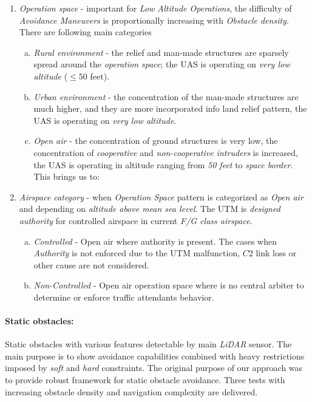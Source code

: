 \begin{enumerate}
    \item \emph{Operation space} - important for \emph{Low Altitude Operations}, the difficulty of \emph{Avoidance Maneuvers} is proportionally increasing with \emph{Obstacle density}. There are following main categories
    \begin{enumerate}[a.]
        \item \emph{Rural environment} - the relief and man-made structures are sparsely spread around the \emph{operation space};  the UAS is operating on \emph{very low altitude} ($\le 50$ feet).
        
        \item \emph{Urban environment} - the concentration of the man-made structures are much higher, and they are more incorporated info land relief pattern, the UAS is operating on \emph{very low altitude}.
        
        \item \emph{Open air} - the concentration of ground structures is very low, the concentration of \emph{cooperative} and \emph{non-cooperative intruders} is increased, the UAS is operating in altitude ranging from \emph{50 feet} to \emph{space border}. This brings us to:
    \end{enumerate}
    
    \item \emph{Airspace category} -  when \emph{Operation Space} pattern is categorized as \emph{Open air} and depending on \emph{altitude above mean sea level}. The UTM  is \emph{designed authority} for controlled airspace in current \emph{F/G class airspace}.
    \begin{enumerate}[a.]
        \item \emph{Controlled} - Open air where authority is present. The cases when \emph{Authority} is not enforced due to the UTM malfunction, $C2$ link loss or other cause are not considered.
        
        \item \emph{Non-Controlled} - Open air operation space where is no central arbiter to determine or enforce traffic attendants behavior.
        
    \end{enumerate}
\end{enumerate}

\paragraph{Static obstacles:}  Static obstacles with various features detectable by main \emph{LiDAR} sensor. The main purpose is to show avoidance capabilities combined with heavy restrictions imposed by \emph{soft} and \emph{hard} constraints. The original purpose of our approach was to provide robust framework for static obstacle avoidance. Three tests with increasing obstacle density and navigation complexity are delivered.

